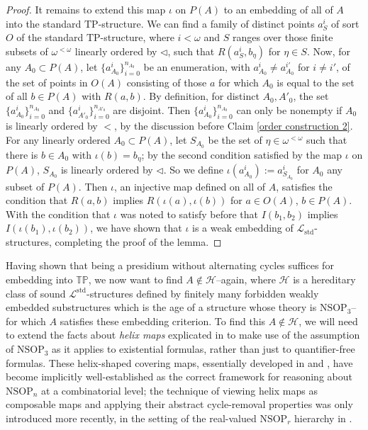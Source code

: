 \documentclass{amsart}
\theoremstyle{definition}
\theoremstyle{remark}
\numberwithin{equation}{section}
\begin{document}
\begin{proof}
It remains to extend this map $\iota$ on $P(A)$ to an embedding of all of $A$ into the standard $\mathrm{TP}$-structure. We can find a family of distinct points $a^i_{S}$ of sort $O$ of the standard $\mathrm{TP}$-structure, where $i < \omega$ and $S$ ranges over those finite subsets of $\omega^{< \omega}$ linearly ordered by $\lhd$, such that $R(a_{S}^{i}, b_{\eta})$ for $\eta \in S$. Now, for any $A_{0} \subset P(A)$, let $\{a_{A_{0}}^{i}\}^{n_{A_{0}}}_{i =0}$ be an enumeration, with $a^{i}_{A_{0}} \neq a_{A_{0}}^{i'}$ for $i \neq i'$, of the set of points in $O(A)$ consisting of those $a$ for which $A_0$ is equal to the set of all $b \in P(A)$ with $R(a, b)$. By definition, for distinct $A_{0}, A'_{0}$, the set $\{a_{A_{0}}^{i}\}^{n_{A_{0}}}_{i =0}$ and $\{a_{A'_{0}}^{i}\}^{n_{A'_{0}}}_{i =0}$ are disjoint.  Then $\{a_{A_{0}}^{i}\}^{n_{A_{0}}}_{i =0}$ can only be nonempty if $A_{0}$ is linearly ordered by $<$, by the discussion before Claim \ref{order construction 2}.  For any linearly ordered $A_{0} \subset P(A)$, let $S_{A_0}$ be the set of $\eta \in \omega^{<\omega}$ such that there is $b \in A_{0}$ with $\iota(b) = b_{\eta}$; by the second condition satisfied by the map $\iota$ on $P(A)$, $S_{A_0}$ is linearly ordered by $\lhd$. So we define $\iota(a^i_{A_{0}}):=a_{S_{A_{0}}}^{i}$ for $A_0$ any subset of $P(A)$. Then $\iota$, an injective map defined on all of $A$, satisfies the condition that $R(a, b)$ implies $R(\iota(a), \iota(b))$ for $a \in O(A)$, $b\in P(A)$. With the condition that $\iota$ was noted to satisfy before that $I(b_1, b_2)$ implies $I(\iota(b_1), \iota(b_2))$, we have shown that $\iota$ is a weak embedding of $\mathcal{L}_{\mathrm{std}}$-structures, completing the proof of the lemma.

\end{proof}

Having shown that being a presidium without alternating cycles suffices for embedding into $\mathbb{TP}$, we now want to find $A \notin \mathcal{H}$--again, where $\mathcal{H}$ is a hereditary class of sound $\mathcal{L}^{\mathrm{std}}$-structures defined by finitely many forbidden weakly embedded substructures which is the age of a structure whose theory is $\mathrm{NSOP}_{3}$--for which $A$ satisfies these embedding criterion. To find this $A \notin \mathcal{H}$, we will need to extend the facts about \textit{helix maps} explicated in \cite{ApproxOrder} to make use of the assumption of $\mathrm{NSOP}_{3}$ as it applies to existential formulas, rather than just to quantifier-free formulas. These helix-shaped covering maps, essentially developed in \cite{She95} and \cite{Mal10b}, have become implicitly well-established as the correct framework for reasoning about $\mathrm{NSOP}_{n}$ at a combinatorial level; the technique of viewing helix maps as composable maps and applying their abstract cycle-removal properties was only introduced more recently, in the setting of the real-valued $\mathrm{NSOP}_{r}$ hierarchy in \cite{ApproxOrder}. 
\end{document}
